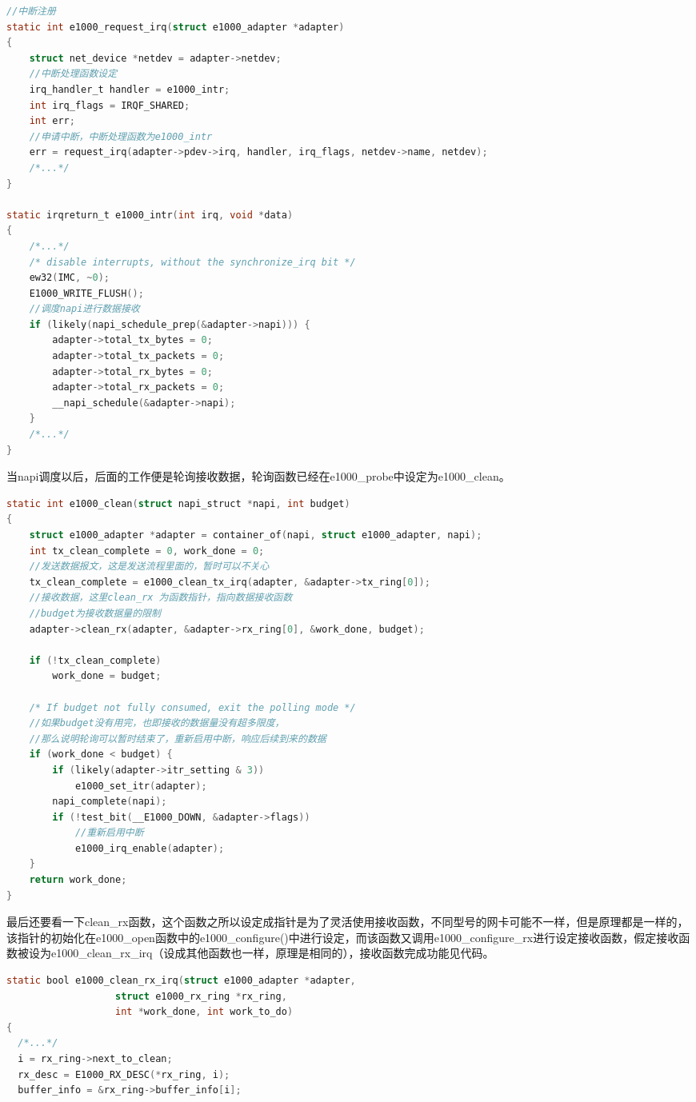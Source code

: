 \documentclass[fontsize=11pt, %
                             paper=a4, %
                             oneside, %
                             captions=tableheading,
                             index=totoc,
                             hyperref]{labbook}
\begin{document}
\begin{addmargin}[0cm]{0cm}
\begin{lstlisting}[language=C]
//中断注册
static int e1000_request_irq(struct e1000_adapter *adapter)
{
    struct net_device *netdev = adapter->netdev;
    //中断处理函数设定
    irq_handler_t handler = e1000_intr;
    int irq_flags = IRQF_SHARED;
    int err;
    //申请中断，中断处理函数为e1000_intr
    err = request_irq(adapter->pdev->irq, handler, irq_flags, netdev->name, netdev);
    /*...*/
}

static irqreturn_t e1000_intr(int irq, void *data)
{
    /*...*/
    /* disable interrupts, without the synchronize_irq bit */
    ew32(IMC, ~0);
    E1000_WRITE_FLUSH();
    //调度napi进行数据接收
    if (likely(napi_schedule_prep(&adapter->napi))) {
        adapter->total_tx_bytes = 0;
        adapter->total_tx_packets = 0;
        adapter->total_rx_bytes = 0;
        adapter->total_rx_packets = 0;
        __napi_schedule(&adapter->napi);
    }
    /*...*/
}
\end{lstlisting}

\indent 当napi调度以后，后面的工作便是轮询接收数据，轮询函数已经在e1000\_probe中设定为e1000\_clean。\\
\begin{lstlisting}[language=C]
static int e1000_clean(struct napi_struct *napi, int budget)
{
    struct e1000_adapter *adapter = container_of(napi, struct e1000_adapter, napi);
    int tx_clean_complete = 0, work_done = 0;
    //发送数据报文，这是发送流程里面的，暂时可以不关心
    tx_clean_complete = e1000_clean_tx_irq(adapter, &adapter->tx_ring[0]);
    //接收数据，这里clean_rx 为函数指针，指向数据接收函数 
    //budget为接收数据量的限制
    adapter->clean_rx(adapter, &adapter->rx_ring[0], &work_done, budget);

    if (!tx_clean_complete)
        work_done = budget;

    /* If budget not fully consumed, exit the polling mode */
    //如果budget没有用完，也即接收的数据量没有超多限度，
    //那么说明轮询可以暂时结束了，重新启用中断，响应后续到来的数据
    if (work_done < budget) {
        if (likely(adapter->itr_setting & 3))
            e1000_set_itr(adapter);
        napi_complete(napi);
        if (!test_bit(__E1000_DOWN, &adapter->flags))
            //重新启用中断
            e1000_irq_enable(adapter);
    }
    return work_done;
}
\end{lstlisting}

\indent 最后还要看一下clean\_rx函数，这个函数之所以设定成指针是为了灵活使用接收函数，不同型号的网卡可能不一样，但是原理都是一样的，该指针的初始化在e1000\_open函数中的e1000\_configure()中进行设定，而该函数又调用e1000\_configure\_rx进行设定接收函数，假定接收函数被设为e1000\_clean\_rx\_irq（设成其他函数也一样，原理是相同的），接收函数完成功能见代码。\\
\begin{lstlisting}[language=C]
static bool e1000_clean_rx_irq(struct e1000_adapter *adapter,
			       struct e1000_rx_ring *rx_ring,
			       int *work_done, int work_to_do)
{
  /*...*/
  i = rx_ring->next_to_clean;
  rx_desc = E1000_RX_DESC(*rx_ring, i);
  buffer_info = &rx_ring->buffer_info[i];


\end{lstlisting}
\end{addmargin}
\end{document}
